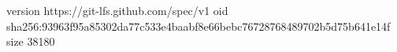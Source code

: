 version https://git-lfs.github.com/spec/v1
oid sha256:93963f95a85302da77c533e4baabf8e66bebc76728768489702b5d75b641e14f
size 38180
